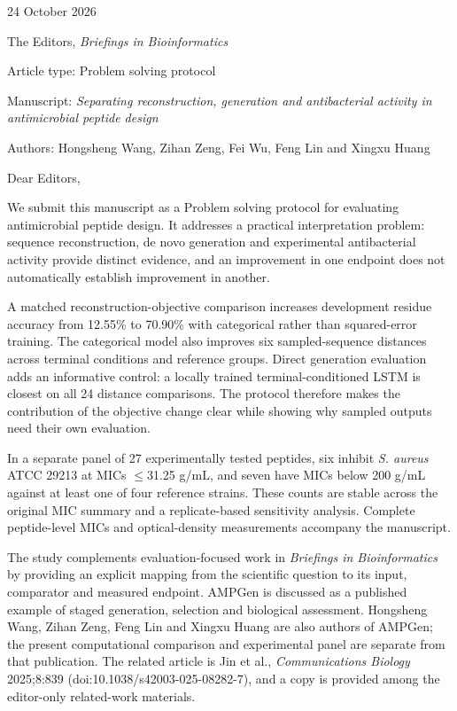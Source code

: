 \documentclass[11pt,a4paper]{article}
\begin{document}
24 October 2026\par
The Editors, \textit{Briefings in Bioinformatics}\par
Article type: Problem solving protocol\par
Manuscript: \textit{Separating reconstruction, generation and antibacterial activity in antimicrobial peptide design}\par
Authors: Hongsheng Wang, Zihan Zeng, Fei Wu, Feng Lin and Xingxu Huang

Dear Editors,

We submit this manuscript as a Problem solving protocol for evaluating antimicrobial peptide design. It addresses a practical interpretation problem: sequence reconstruction, de novo generation and experimental antibacterial activity provide distinct evidence, and an improvement in one endpoint does not automatically establish improvement in another.

A matched reconstruction-objective comparison increases development residue accuracy from 12.55\% to 70.90\% with categorical rather than squared-error training. The categorical model also improves six sampled-sequence distances across terminal conditions and reference groups. Direct generation evaluation adds an informative control: a locally trained terminal-conditioned LSTM is closest on all 24 distance comparisons. The protocol therefore makes the contribution of the objective change clear while showing why sampled outputs need their own evaluation.

In a separate panel of 27 experimentally tested peptides, six inhibit \textit{S. aureus} ATCC 29213 at MICs $\leq$31.25 \textmu{}g/mL, and seven have MICs below 200 \textmu{}g/mL against at least one of four reference strains. These counts are stable across the original MIC summary and a replicate-based sensitivity analysis. Complete peptide-level MICs and optical-density measurements accompany the manuscript.

The study complements evaluation-focused work in \textit{Briefings in Bioinformatics} by providing an explicit mapping from the scientific question to its input, comparator and measured endpoint. AMPGen is discussed as a published example of staged generation, selection and biological assessment. Hongsheng Wang, Zihan Zeng, Feng Lin and Xingxu Huang are also authors of AMPGen; the present computational comparison and experimental panel are separate from that publication. The related article is Jin et al., \textit{Communications Biology} 2025;8:839 (doi:10.1038/s42003-025-08282-7), and a copy is provided among the editor-only related-work materials.
\end{document}
